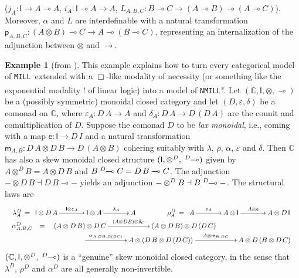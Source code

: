 \documentclass[copyright,creativecommons]{eptcs}
\theoremstyle{definition}
\newtheorem{example}{Example}[section]
\newcommand{\ot}{\otimes}
\newcommand{\lolli}{\multimap}
\newcommand{\I}{\mathsf{I}}
\newcommand{\otd}{\ot^D}
\newcommand{\lollid}{\;\textsuperscript{$D$}\!\!\lolli}
\newcommand{\MILL}{\texttt{MILL}}
\newcommand{\NMILL}{\texttt{NMILL}}
\newcommand{\SkNMILL}{\NMILL\textsuperscript{\textit{s}}}
\begin{document}
($j_A : \I \to A \lolli A$, $i_A : \I \lolli A \to A$, $L_{A,B,C} : B \lolli C \to (A \lolli B) \lolli (A \lolli C)$).
Moreover, $\alpha$ and $L$ are interdefinable with a natural transformation $\mathsf{p}_{A , B , C} : (A \ot B) \lolli C \to A \lolli (B \lolli C)$, representing an internalization of the adjunction between $\ot$ and $\lolli$.
\begin{example}[from \cite{uustalu:eilenberg-kelly:2020}]
This example explains how to turn every categorical model of \MILL\ extended with a $\Box$-like modality of necessity (or something like the exponential modality $!$ of linear logic) into a model of \SkNMILL. 
Let $(\mathbb{C},\I,\ot,\lolli)$ be a (possibly symmetric) monoidal closed category and let $(D,\varepsilon, \delta)$ be a comonad on $\mathbb{C}$, where $\varepsilon_A : D\,A \to A$ and $\delta_A : D\,A \to D\,(D\,A)$ are the counit and comultiplication of $D$. Suppose the comonad $D$ to be \emph{lax monoidal}, i.e., coming with a map $\mathsf{e} : \I \to D\,I$ and a natural transformation $\mathsf{m}_{A,B} : D \,A \ot D\,B \to D\,(A \ot B)$ cohering suitably with $\lambda$, $\rho$, $\alpha$, $\varepsilon$ and $\delta$.
Then $\mathbb{C}$ has also a skew monoidal closed structure $(\I, \otd, \lollid)$ given by  $A \otd B = A \ot D\,B$ and $B \lollid C = D\,B \lolli C$. The adjunction ${-} \ot D\,B \dashv D\,B \lolli {-}$ yields an adjunction ${-} \otd B \dashv B \lollid {-}$. The structural laws are
\[
\begin{array}{c}
\lambda^D_A \, = \, \xymatrix@C=3pc{\I \ot D\,A \ar[r]^-{\I \ot \varepsilon_A} & \I \ot A \ar[r]^-{\lambda_A} & A} 
\hspace*{1.5cm}
\rho^D_A \, = \, \xymatrix@C=3pc{A \ar[r]^-{\rho_A} & A \ot \I \ar[r]^-{A \ot \mathsf{e}} & A \ot D\,\I} 
\\
\begin{array}{rcl}
\alpha^D_{A,B,C} & = & \xymatrix@C=5pc{(A \ot D\,B) \ot D\,C 
                   \ar[r]^-{(A \ot D B) \ot \delta_C}
                   & (A \ot D\,B) \ot D\,(D\,C)} \\
& & \hspace*{1.5cm} \xymatrix@C=5pc{\ar[r]^-{\alpha_{A,DB,D(DC)}}
                  & A \ot (D\,B \ot D\,(D\,C)) \ar[r]^-{A \ot \mathsf{m}_{B,DC}}
                  & A \ot D\,(B \ot D\,C)}
\end{array}
\end{array}
\]
$(\mathbb{C},\I,\otd,\lollid)$  is a ``genuine'' skew monoidal closed category, in the sense that $\lambda^D$, $\rho^D$ and $\alpha^D$ are all generally non-invertible.
\end{example}
\end{document}
